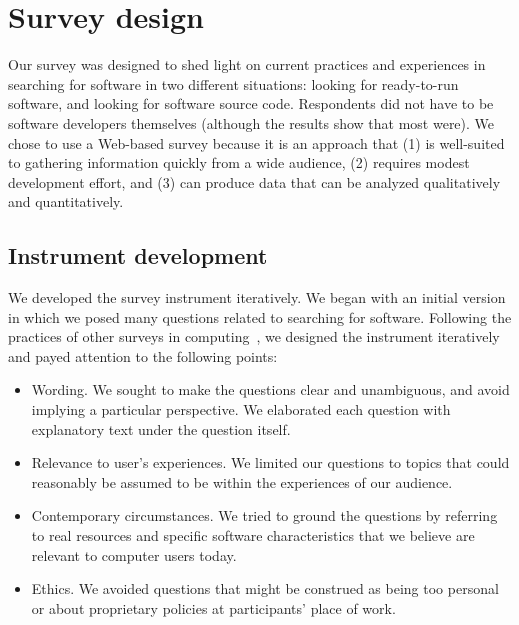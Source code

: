 \documentclass{casicswhitepaper}
\begin{document}
\section{Survey design}

Our survey was designed to shed light on current practices and experiences in searching for software in two different situations: looking for ready-to-run software, and looking for software source code.  Respondents did not have to be software developers themselves (although the results show that most were).  We chose to use a Web-based survey because it is an approach that (1) is well-suited to gathering information quickly from a wide audience, (2) requires modest development effort, and (3) can produce data that can be analyzed qualitatively and quantitatively.


\subsection{Instrument development}

We developed the survey instrument iteratively.  We began with an initial version in which we posed many questions related to searching for software.  Following the practices of other surveys in computing~\cite[e.g.,][]{varnellsarjeant2015comparing, kitchenham_2008}, we designed the instrument iteratively and payed attention to the following points:

\begin{itemize}

\item Wording.  We sought to make the questions clear and unambiguous, and avoid implying a particular perspective.  We elaborated each question with explanatory text under the question itself.

\item Relevance to user's experiences.  We limited our questions to topics that could reasonably be assumed to be within the experiences of our audience.

\item Contemporary circumstances.  We tried to ground the questions by referring to real resources and specific software characteristics that we believe are relevant to computer users today.

\item Ethics.  We avoided questions that might be construed as being too personal or about proprietary policies at participants' place of work.

\end{itemize}
\end{document}
